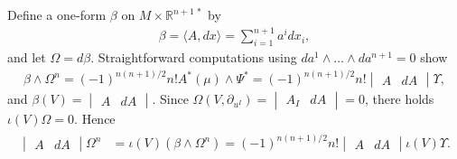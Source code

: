 \documentclass [leqno, 10pt]{amsart}
\theoremstyle{definition}
\numberwithin{equation}{section}
\newcommand{\Om}{\Omega}
\newcommand{\imt}{\iota}
\newcommand{\lb}{\langle}
\newcommand{\ra}{\rangle}
\newcommand{\be}{\beta}
\newcommand{\rea}{\mathbb R}
\begin{document}
Define a one-form $\be$ on $M \times \rea^{n+1\,\ast}$ by
\begin{align}\label{bedefined}
\be = \lb A, dx \ra = \sum_{i = 1}^{n+1}a^{i}dx_{i},
\end{align}
and let $\Om = d\be$. Straightforward computations using $da^{1} \wedge \dots \wedge da^{n+1} = 0$ show
\begin{align}\label{becontact}
\be \wedge \Om^{n} = (-1)^{n(n+1)/2}n!A^{\ast}(\mu) \wedge \Psi^{\ast} = (-1)^{n(n+1)/2}n!\begin{vmatrix} A & dA \end{vmatrix} \Upsilon, 
\end{align}
and $\be(V) = \begin{vmatrix} A & dA \end{vmatrix}$. Since $\Om(V, \partial_{u^{I}}) = \begin{vmatrix} A_{I} & dA \end{vmatrix} = 0$, there holds $\imt(V)\Om = 0$. Hence
\begin{align}\label{vom}
\begin{split}
\begin{vmatrix} A & dA \end{vmatrix} \Om^{n} & = \imt(V)(\be \wedge \Om^{n}) = (-1)^{n(n+1)/2}n!\begin{vmatrix} A & dA \end{vmatrix} \imt(V)\Upsilon.
\end{split}
\end{align}
\end{document}
